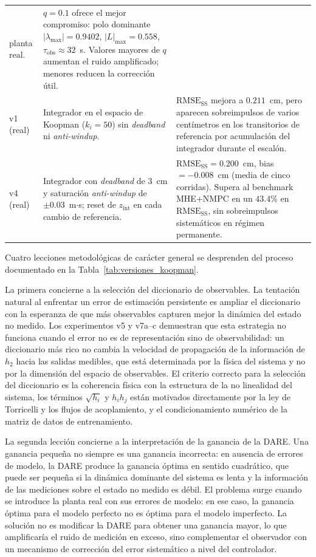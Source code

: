 \documentclass[12pt,letterpaper]{article}
\begin{document}
\begin{longtable}{p{1.8cm} p{7.0cm} p{6.5cm}}
planta real. &
$q = 0.1$ ofrece el mejor compromiso: polo dominante
$|\lambda_{\max}| = 0.9402$, $|L|_{\max} = 0.558$,
$\tau_{\mathrm{obs}} \approx 32$~s. Valores mayores de $q$
aumentan el ruido amplificado; menores reducen la corrección
útil. \\
v1 (real) & Integrador en el espacio de Koopman ($k_i = 50$)
sin \textit{deadband} ni \textit{anti-windup}. &
$\mathrm{RMSE}_{\mathrm{SS}}$ mejora a $0.211$~cm, pero aparecen
sobreimpulsos de varios centímetros en los transitorios de
referencia por acumulación del integrador durante el escalón. \\
v4 (real) & Integrador con \textit{deadband} de $3$~cm y
saturación \textit{anti-windup} de $\pm 0.03$~m$\cdot$s;
reset de $z_{\mathrm{int}}$ en cada cambio de referencia. &
$\mathrm{RMSE}_{\mathrm{SS}} = 0.200$~cm, bias $= -0.008$~cm
(media de cinco corridas). Supera al benchmark MHE+NMPC
en un $43.4\%$ en $\mathrm{RMSE}_{\mathrm{SS}}$, sin
sobreimpulsos sistemáticos en régimen permanente. \\

\end{longtable}

Cuatro lecciones metodológicas de carácter general se desprenden 
del proceso documentado en la Tabla~\ref{tab:versiones_koopman}.

La primera concierne a la selección del diccionario de observables. 
La tentación natural al enfrentar un error de estimación 
persistente es ampliar el diccionario con la esperanza de que 
más observables capturen mejor la dinámica del estado no medido. 
Los experimentos v5 y v7a--c demuestran que esta estrategia no 
funciona cuando el error no es de representación sino de 
observabilidad: un diccionario más rico no cambia la velocidad 
de propagación de la información de $h_2$ hacia las salidas 
medibles, que está determinada por la física del sistema y no 
por la dimensión del espacio de observables. El criterio correcto 
para la selección del diccionario es la coherencia física con la 
estructura de la no linealidad del sistema, los términos
$\sqrt{h_i}$ y $h_i h_j$ están motivados directamente por la
ley de Torricelli y los flujos de acoplamiento, y el
condicionamiento numérico de la matriz de datos de entrenamiento.

La segunda lección concierne a la interpretación de la ganancia 
de la DARE. Una ganancia pequeña no siempre es una ganancia 
incorrecta: en ausencia de errores de modelo, la DARE produce 
la ganancia óptima en sentido cuadrático, que puede ser pequeña 
si la dinámica dominante del sistema es lenta y la información 
de las mediciones sobre el estado no medido es débil. El problema 
surge cuando se introduce la planta real con sus errores de 
modelo: en ese caso, la ganancia óptima para el modelo perfecto 
no es óptima para el modelo imperfecto. La solución no es 
modificar la DARE para obtener una ganancia mayor, lo que
amplificaría el ruido de medición en exceso, sino complementar
el observador con un mecanismo de corrección del error sistemático 
a nivel del controlador.
\end{document}

